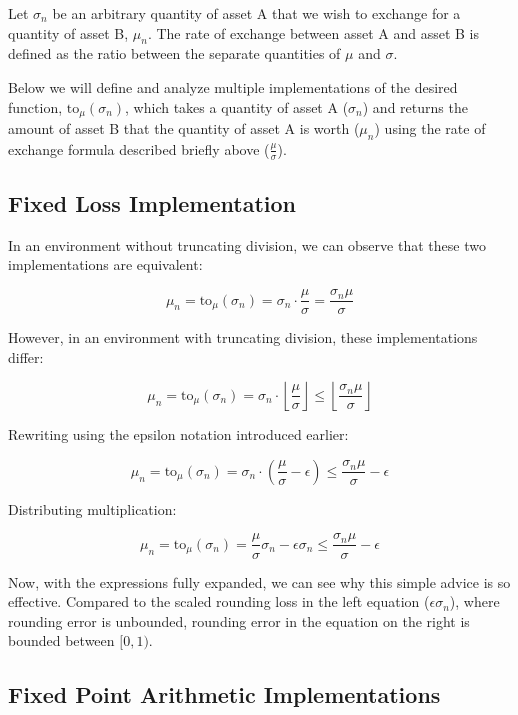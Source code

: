 \documentclass{article}
\begin{document}
Let $\sigma_n$ be an arbitrary quantity of asset A that we wish to exchange for a quantity of asset B, $\mu_n$. The rate of exchange between asset A and asset B is defined as the ratio between the separate quantities of $\mu$ and $\sigma$. 

Below we will define and analyze multiple implementations of the desired function, $\mbox{to}_\mu(\sigma_n)$, which takes a quantity of asset A ($\sigma_n$) and returns the amount of asset B that the quantity of asset A is worth ($\mu_n$) using the rate of exchange formula described briefly above ($\frac{\mu}{\sigma}$).

\subsection{Fixed Loss Implementation}

In an environment without truncating division, we can observe that these two implementations are equivalent:

$$ \mu_n = \mbox{to}_\mu(\sigma_n) = \sigma_n \cdot \frac{\mu}{\sigma} = \frac{\sigma_n\mu}{\sigma} $$

However, in an environment with truncating division, these implementations differ:

$$ \mu_n = \mbox{to}_\mu(\sigma_n) = \sigma_n \cdot \left\lfloor\frac{\mu}{\sigma}\right\rfloor \leq \left\lfloor\frac{\sigma_n\mu}{\sigma}\right\rfloor $$

Rewriting using the epsilon notation introduced earlier:

$$ \mu_n = \mbox{to}_\mu(\sigma_n) = \sigma_n \cdot \left(\frac{\mu}{\sigma} - \epsilon\right) \leq \frac{\sigma_n\mu}{\sigma} - \epsilon $$

Distributing multiplication:

$$ \mu_n = \mbox{to}_\mu(\sigma_n) = \frac{\mu}{\sigma}\sigma_n - \epsilon\sigma_n \leq \frac{\sigma_n\mu}{\sigma} - \epsilon $$


Now, with the expressions fully expanded, we can see why this simple advice is so effective. Compared to the scaled rounding loss in the left equation ($\epsilon\sigma_n$), where rounding error is unbounded, rounding error in the equation on the right is bounded between $[0, 1)$.

\newpage

\subsection{Fixed Point Arithmetic Implementations}
\end{document}
